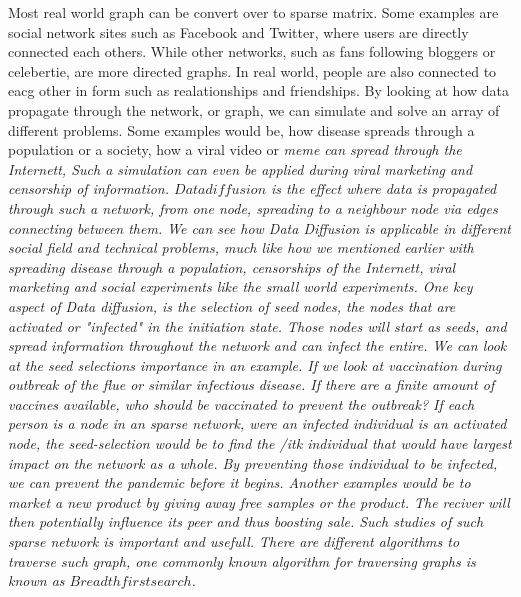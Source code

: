 Most real world graph can be convert over to sparse matrix. Some examples are social network sites such as Facebook and Twitter, where users are directly connected each others. While other networks, such as fans following bloggers or celebertie, are more directed graphs. In real world, people are also connected to eacg other in form such as realationships and friendships. By looking at how data propagate through the network, or graph, we can simulate and solve an array of different problems. Some examples would be, how disease spreads through a population or a society, how a viral video or \it{meme} can spread through the Internett, Such a simulation can even be applied during viral marketing and censorship of information. $Data diffusion$ is the effect where data is propagated through such a network, from one node, spreading to a neighbour node via edges connecting between them. We can see how Data Diffusion is applicable in different social field and technical problems, much like how we mentioned earlier with spreading disease through a population, censorships of the Internett, viral marketing and social experiments like the small world experiments. One key aspect of Data diffusion, is the selection of seed nodes, the nodes that are activated or "infected" in the initiation state. Those nodes will start as seeds, and spread information throughout the network and can infect the entire. We can look at the seed selections importance in an example. If we look at vaccination during outbreak of the flue or similar infectious disease. If there are a finite amount of vaccines available, who should be vaccinated to prevent the outbreak? If each person is a node in an sparse network, were an infected individual is an activated node, the seed-selection would be to find the /it{k} individual that would have largest impact on the network as a whole. By preventing those individual to be infected, we can prevent the pandemic before it begins. Another examples would be to market a new product by giving away free samples or the product. The reciver will then potentially influence its peer and thus boosting sale. Such studies of such sparse network is important and usefull. There are different algorithms to traverse such graph, one commonly known algorithm for traversing graphs is known as $Breadth first search$. 


